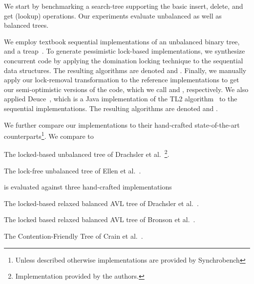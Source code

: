 We start by benchmarking a search-tree supporting the basic insert,
delete, and get (lookup) operations. Our experiments evaluate unbalanced as well
as balanced trees.

We employ textbook sequential implementations of an unbalanced binary
tree, and a treap~\cite{AragonS1989}. To
generate pessimistic lock-based implementations, we synthesize
concurrent code by applying the domination locking technique to the sequential
data structures. The resulting algorithms are denoted \domTree and \domTreap.
Finally, we manually apply our lock-removal transformation to the reference
implementations to get our semi-optimistic versions of the code, which we call
\autoTree and \autoTreap, respectively.
We also applied Deuce~\cite{Deuce2010}, which is a Java implementation of the TL2 algorithm~\cite{DiceSS2006} to the sequential implementations. The resulting algorithms are denoted \stmTree and \stmTreap.

We further compare our implementations to their hand-crafted state-of-the-art counterparts\footnote{Unless described otherwise implementations are provided by Synchrobench}. We compare \autoTree to
\begin{description}
\setlength{\itemsep}{0pt}
\setlength{\parskip}{0pt}
\item[\danaTree] The locked-based unbalanced tree of Drachsler et al.~\cite{DrachslerVY2014}\footnote{Implementation provided by the authors.}.
\item [\lockfreeTree] The lock-free unbalanced tree of Ellen et al.~\cite{EllenFRB2010}.
\end{description}
\autoTreap is evaluated against three hand-crafted implementations
\begin{description}
\setlength{\itemsep}{0pt}
\setlength{\parskip}{0pt}
\item[\danaAVL] The locked-based relaxed balanced AVL tree of
				Drachsler et al.~\cite{DrachslerVY2014}.%
\item[\bronson] The locked based relaxed balanced AVL tree
				of Bronson et al.~\cite{BronsonCCO2010}.%
\item[\friendly] The Contention-Friendly Tree of Crain et al.~\cite{CrainGR2013}.
\end{description}

